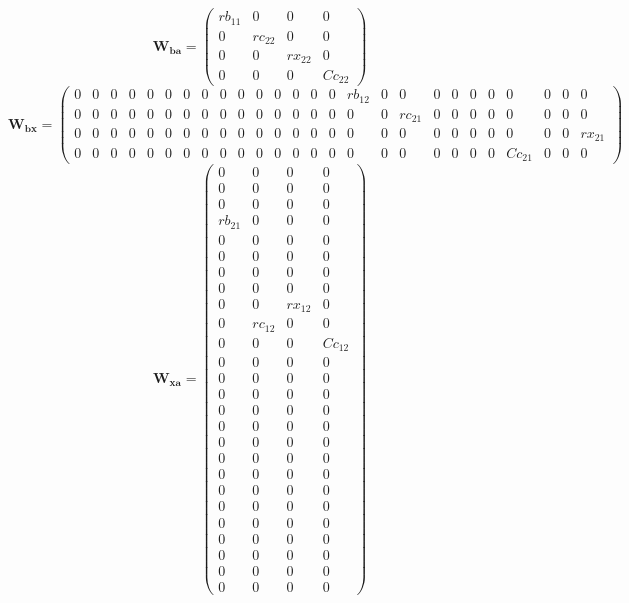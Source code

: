 \[ \mathbf{W_{ba}} = \left(\begin{smallmatrix} rb_{11} & 0 & 0 & 0 \\
0 & rc_{22} & 0 & 0 \\ 0 & 0 & rx_{22} & 0 \\ 0 & 0 & 0 & Cc_{22}
\end{smallmatrix}\right) \]
\[ \mathbf{W_{bx}} = \left(\begin{smallmatrix} 0 & 0 & 0 & 0 & 0 & 0 &
0 & 0 & 0 & 0 & 0 & 0 & 0 & 0 & 0 & rb_{12} & 0 & 0 & 0 & 0 & 0 & 0 &
0 & 0 & 0 & 0 \\ 0 & 0 & 0 & 0 & 0 & 0 & 0 & 0 & 0 & 0 & 0 & 0 & 0 & 0
& 0 & 0 & 0 & rc_{21} & 0 & 0 & 0 & 0 & 0 & 0 & 0 & 0 \\ 0 & 0 & 0 & 0
& 0 & 0 & 0 & 0 & 0 & 0 & 0 & 0 & 0 & 0 & 0 & 0 & 0 & 0 & 0 & 0 & 0 &
0 & 0 & 0 & 0 & rx_{21} \\ 0 & 0 & 0 & 0 & 0 & 0 & 0 & 0 & 0 & 0 & 0 &
0 & 0 & 0 & 0 & 0 & 0 & 0 & 0 & 0 & 0 & 0 & Cc_{21} & 0 & 0 & 0
\end{smallmatrix}\right) \]
\[ \mathbf{W_{xa}} = \left(\begin{smallmatrix} 0 & 0 & 0 & 0 \\ 0 & 0
& 0 & 0 \\ 0 & 0 & 0 & 0 \\ rb_{21} & 0 & 0 & 0 \\ 0 & 0 & 0 & 0 \\ 0
& 0 & 0 & 0 \\ 0 & 0 & 0 & 0 \\ 0 & 0 & 0 & 0 \\ 0 & 0 & rx_{12} & 0
\\ 0 & rc_{12} & 0 & 0 \\ 0 & 0 & 0 & Cc_{12} \\ 0 & 0 & 0 & 0 \\ 0 &
0 & 0 & 0 \\ 0 & 0 & 0 & 0 \\ 0 & 0 & 0 & 0 \\ 0 & 0 & 0 & 0 \\ 0 & 0
& 0 & 0 \\ 0 & 0 & 0 & 0 \\ 0 & 0 & 0 & 0 \\ 0 & 0 & 0 & 0 \\ 0 & 0 &
0 & 0 \\ 0 & 0 & 0 & 0 \\ 0 & 0 & 0 & 0 \\ 0 & 0 & 0 & 0 \\ 0 & 0 & 0
& 0 \\ 0 & 0 & 0 & 0 \end{smallmatrix}\right) \]
